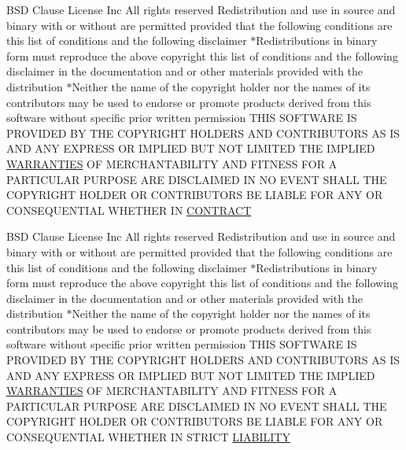 \begin{DoxyCompactItemize}
\item 
B\+SD Clause License Inc All rights reserved Redistribution and use in source and binary with or without are permitted provided that the following conditions are this list of conditions and the following disclaimer $\ast$Redistributions in binary form must reproduce the above copyright this list of conditions and the following disclaimer in the documentation and or other materials provided with the distribution $\ast$Neither the name of the copyright holder nor the names of its contributors may be used to endorse or promote products derived from this software without specific prior written permission T\+H\+IS S\+O\+F\+T\+W\+A\+RE IS P\+R\+O\+V\+I\+D\+ED BY T\+HE C\+O\+P\+Y\+R\+I\+G\+HT H\+O\+L\+D\+E\+RS A\+ND C\+O\+N\+T\+R\+I\+B\+U\+T\+O\+RS AS IS A\+ND A\+NY E\+X\+P\+R\+E\+SS OR I\+M\+P\+L\+I\+ED B\+UT N\+OT L\+I\+M\+I\+T\+ED T\+HE I\+M\+P\+L\+I\+ED \hyperlink{LICENSE_8txt_a8472295fc7dc3e152751655a351cab17}{W\+A\+R\+R\+A\+N\+T\+I\+ES} OF M\+E\+R\+C\+H\+A\+N\+T\+A\+B\+I\+L\+I\+TY A\+ND F\+I\+T\+N\+E\+SS F\+OR A P\+A\+R\+T\+I\+C\+U\+L\+AR P\+U\+R\+P\+O\+SE A\+RE D\+I\+S\+C\+L\+A\+I\+M\+ED IN NO E\+V\+E\+NT S\+H\+A\+LL T\+HE C\+O\+P\+Y\+R\+I\+G\+HT H\+O\+L\+D\+ER OR C\+O\+N\+T\+R\+I\+B\+U\+T\+O\+RS BE L\+I\+A\+B\+LE F\+OR A\+NY OR C\+O\+N\+S\+E\+Q\+U\+E\+N\+T\+I\+AL W\+H\+E\+T\+H\+ER IN \hyperlink{LICENSE_8txt_aaa5eea22ce8028d9371e003fd23516c9}{C\+O\+N\+T\+R\+A\+CT}
\item 
B\+SD Clause License Inc All rights reserved Redistribution and use in source and binary with or without are permitted provided that the following conditions are this list of conditions and the following disclaimer $\ast$Redistributions in binary form must reproduce the above copyright this list of conditions and the following disclaimer in the documentation and or other materials provided with the distribution $\ast$Neither the name of the copyright holder nor the names of its contributors may be used to endorse or promote products derived from this software without specific prior written permission T\+H\+IS S\+O\+F\+T\+W\+A\+RE IS P\+R\+O\+V\+I\+D\+ED BY T\+HE C\+O\+P\+Y\+R\+I\+G\+HT H\+O\+L\+D\+E\+RS A\+ND C\+O\+N\+T\+R\+I\+B\+U\+T\+O\+RS AS IS A\+ND A\+NY E\+X\+P\+R\+E\+SS OR I\+M\+P\+L\+I\+ED B\+UT N\+OT L\+I\+M\+I\+T\+ED T\+HE I\+M\+P\+L\+I\+ED \hyperlink{LICENSE_8txt_a8472295fc7dc3e152751655a351cab17}{W\+A\+R\+R\+A\+N\+T\+I\+ES} OF M\+E\+R\+C\+H\+A\+N\+T\+A\+B\+I\+L\+I\+TY A\+ND F\+I\+T\+N\+E\+SS F\+OR A P\+A\+R\+T\+I\+C\+U\+L\+AR P\+U\+R\+P\+O\+SE A\+RE D\+I\+S\+C\+L\+A\+I\+M\+ED IN NO E\+V\+E\+NT S\+H\+A\+LL T\+HE C\+O\+P\+Y\+R\+I\+G\+HT H\+O\+L\+D\+ER OR C\+O\+N\+T\+R\+I\+B\+U\+T\+O\+RS BE L\+I\+A\+B\+LE F\+OR A\+NY OR C\+O\+N\+S\+E\+Q\+U\+E\+N\+T\+I\+AL W\+H\+E\+T\+H\+ER IN S\+T\+R\+I\+CT \hyperlink{LICENSE_8txt_a416744a998d192df4986ba8975d9bb08}{L\+I\+A\+B\+I\+L\+I\+TY}
\end{DoxyCompactItemize}


